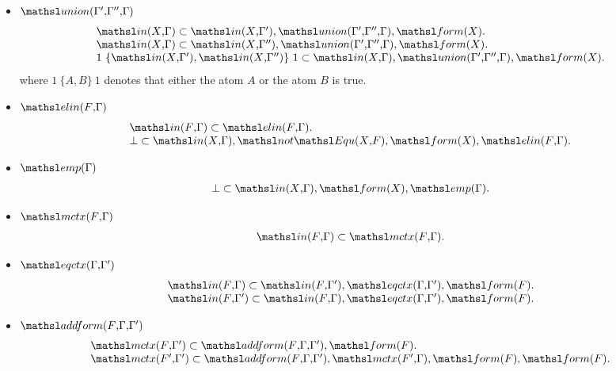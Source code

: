 \begin{itemize}

\item $\union{\Gamma'}{\Gamma''}{\Gamma}$
\[
\begin{array}{l}
\In{X}{\Gamma} \subset \In{X}{\Gamma'}, \union{\Gamma'}{\Gamma''}{\Gamma},
\form{X}. \\
\In{X}{\Gamma} \subset \In{X}{\Gamma''}, \union{\Gamma'}{\Gamma''}{\Gamma},
\form{X}. \\
1~ \{\In{X}{\Gamma'}, \In{X}{\Gamma''}\}~ 1  \subset \In{X}{\Gamma},
\union{\Gamma'}{\Gamma''}{\Gamma}, \form{X}.\\
\end{array}
\]
where $1~ \{A, B\}~ 1$ denotes that either the atom $A$ or the atom $B$
is true.

\item $\elin{F}{\Gamma}$
\[
 \begin{array}{l}
  \In{F}{\Gamma} \subset \elin{F}{\Gamma}.\\
  \bot \subset \In{X}{\Gamma}, \tsl{not} \Equ{X}{F}, \form{X},
\elin{F}{\Gamma}.
 \end{array}
\]

\item $\emp{\Gamma}$
\[
 \begin{array}{l}
  \bot \subset \In{X}{\Gamma}, \form{X},\emp{\Gamma}.
 \end{array}
\]

\item $\mctx{F}{\Gamma}$
\[
\begin{array}{l}
  \In{F}{\Gamma} \subset \mctx{F}{\Gamma}.\\
\end{array}
\]

\item $\eqctx{\Gamma}{\Gamma'}$
\[
 \begin{array}{l}
  \In{F}{\Gamma} \subset \In{F}{\Gamma'}, \eqctx{\Gamma}{\Gamma'},
\form{F}.\\
  \In{F}{\Gamma'} \subset \In{F}{\Gamma}, \eqctx{\Gamma}{\Gamma'},
\form{F}.
 \end{array}
\]

\item $\addform{F}{\Gamma}{\Gamma'}$
\[
\begin{array}{l}
\mctx{F}{\Gamma'} \subset \addform{F}{\Gamma}{\Gamma'}, \form{F}.\\
\mctx{F'}{\Gamma'} \subset \addform{F}{\Gamma}{\Gamma'}, \mctx{F'}{\Gamma},
\form{F}, \form{F}.\\
\end{array}
\]

\end{itemize}

